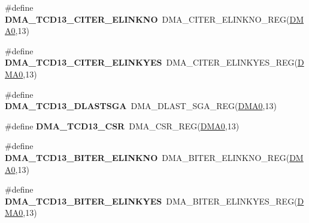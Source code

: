 \begin{DoxyCompactItemize}
\item 
\#define {\bfseries D\+M\+A\+\_\+\+T\+C\+D13\+\_\+\+C\+I\+T\+E\+R\+\_\+\+E\+L\+I\+N\+K\+NO}~D\+M\+A\+\_\+\+C\+I\+T\+E\+R\+\_\+\+E\+L\+I\+N\+K\+N\+O\+\_\+\+R\+EG(\hyperlink{group__DMA__Peripheral__Access__Layer_ga4103044f9ca209772f513dc694513ffb}{D\+M\+A0},13)\hypertarget{group__DMA__Register__Accessor__Macros_gaf9ec26f9d5fe7cd9d8e82e00cc1e753c}{}\label{group__DMA__Register__Accessor__Macros_gaf9ec26f9d5fe7cd9d8e82e00cc1e753c}

\item 
\#define {\bfseries D\+M\+A\+\_\+\+T\+C\+D13\+\_\+\+C\+I\+T\+E\+R\+\_\+\+E\+L\+I\+N\+K\+Y\+ES}~D\+M\+A\+\_\+\+C\+I\+T\+E\+R\+\_\+\+E\+L\+I\+N\+K\+Y\+E\+S\+\_\+\+R\+EG(\hyperlink{group__DMA__Peripheral__Access__Layer_ga4103044f9ca209772f513dc694513ffb}{D\+M\+A0},13)\hypertarget{group__DMA__Register__Accessor__Macros_ga6749c180a5157609bfdb279a46ca1a53}{}\label{group__DMA__Register__Accessor__Macros_ga6749c180a5157609bfdb279a46ca1a53}

\item 
\#define {\bfseries D\+M\+A\+\_\+\+T\+C\+D13\+\_\+\+D\+L\+A\+S\+T\+S\+GA}~D\+M\+A\+\_\+\+D\+L\+A\+S\+T\+\_\+\+S\+G\+A\+\_\+\+R\+EG(\hyperlink{group__DMA__Peripheral__Access__Layer_ga4103044f9ca209772f513dc694513ffb}{D\+M\+A0},13)\hypertarget{group__DMA__Register__Accessor__Macros_ga53a2172bba17c20b89978635f9cad33c}{}\label{group__DMA__Register__Accessor__Macros_ga53a2172bba17c20b89978635f9cad33c}

\item 
\#define {\bfseries D\+M\+A\+\_\+\+T\+C\+D13\+\_\+\+C\+SR}~D\+M\+A\+\_\+\+C\+S\+R\+\_\+\+R\+EG(\hyperlink{group__DMA__Peripheral__Access__Layer_ga4103044f9ca209772f513dc694513ffb}{D\+M\+A0},13)\hypertarget{group__DMA__Register__Accessor__Macros_ga57278ea64ab9f974531a4ee3c57797c6}{}\label{group__DMA__Register__Accessor__Macros_ga57278ea64ab9f974531a4ee3c57797c6}

\item 
\#define {\bfseries D\+M\+A\+\_\+\+T\+C\+D13\+\_\+\+B\+I\+T\+E\+R\+\_\+\+E\+L\+I\+N\+K\+NO}~D\+M\+A\+\_\+\+B\+I\+T\+E\+R\+\_\+\+E\+L\+I\+N\+K\+N\+O\+\_\+\+R\+EG(\hyperlink{group__DMA__Peripheral__Access__Layer_ga4103044f9ca209772f513dc694513ffb}{D\+M\+A0},13)\hypertarget{group__DMA__Register__Accessor__Macros_gaf8d3d5de90640cb72376b1a659fa622b}{}\label{group__DMA__Register__Accessor__Macros_gaf8d3d5de90640cb72376b1a659fa622b}

\item 
\#define {\bfseries D\+M\+A\+\_\+\+T\+C\+D13\+\_\+\+B\+I\+T\+E\+R\+\_\+\+E\+L\+I\+N\+K\+Y\+ES}~D\+M\+A\+\_\+\+B\+I\+T\+E\+R\+\_\+\+E\+L\+I\+N\+K\+Y\+E\+S\+\_\+\+R\+EG(\hyperlink{group__DMA__Peripheral__Access__Layer_ga4103044f9ca209772f513dc694513ffb}{D\+M\+A0},13)\hypertarget{group__DMA__Register__Accessor__Macros_gac91e49de86dc4e5b073510648adce3b3}{}\label{group__DMA__Register__Accessor__Macros_gac91e49de86dc4e5b073510648adce3b3}


\end{DoxyCompactItemize}

